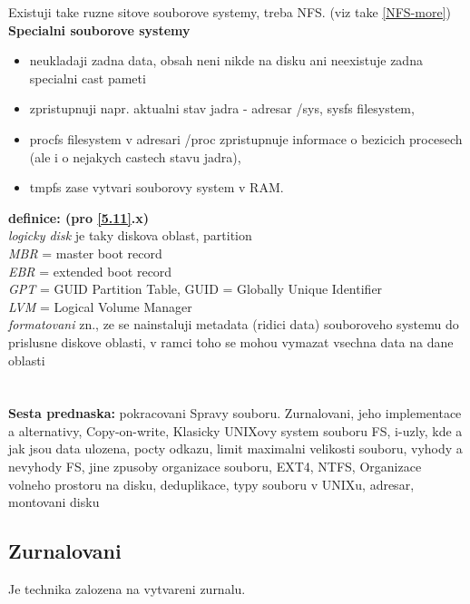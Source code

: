 \documentclass[a4paper, 11pt]{article}
\begin{document}
\noindent Existuji take ruzne sitove souborove systemy, treba NFS. (viz take \ref{NFS-more}) \\

\noindent\textbf{Specialni souborove systemy}
\begin{itemize}
    \item neukladaji zadna data, obsah neni nikde na disku ani neexistuje zadna specialni cast pameti
    \item zpristupnuji napr. aktualni stav jadra - adresar /sys, sysfs filesystem,
    \item procfs filesystem v adresari /proc zpristupnuje informace o bezicich procesech (ale i o nejakych castech stavu jadra),
    \item tmpfs zase vytvari souborovy system v RAM. \\
\end{itemize}

\noindent\textbf{definice: (pro \ref{5.11}.x)} \\[0.5em]
\textit{logicky disk} je taky diskova oblast, partition \\[0.2em]
\textit{MBR} = master boot record \\[0.2em]
\textit{EBR} = extended boot record \\[0.2em]
\textit{GPT} = GUID Partition Table, GUID = Globally Unique Identifier \\[0.2em]
\textit{LVM} = Logical Volume Manager \\[0.2em]
\textit{formatovani} zn., ze se nainstaluji metadata (ridici data) souboroveho systemu do prislusne diskove oblasti, v ramci toho se mohou vymazat vsechna data na dane oblasti \\[0.2em]

\newpage
\setlength{\parindent}{0pt}

\section{}
\textbf{Sesta prednaska:} pokracovani Spravy souboru. Zurnalovani, jeho implementace a alternativy, Copy-on-write, Klasicky UNIXovy system souboru FS, i-uzly, kde a jak jsou data ulozena, pocty odkazu, limit maximalni velikosti souboru, vyhody a nevyhody FS, jine zpusoby organizace souboru, EXT4, NTFS, Organizace volneho prostoru na disku, deduplikace, typy souboru v UNIXu, adresar, montovani disku
\subsection{Zurnalovani}
Je technika zalozena na vytvareni zurnalu.  \\
\end{document}
